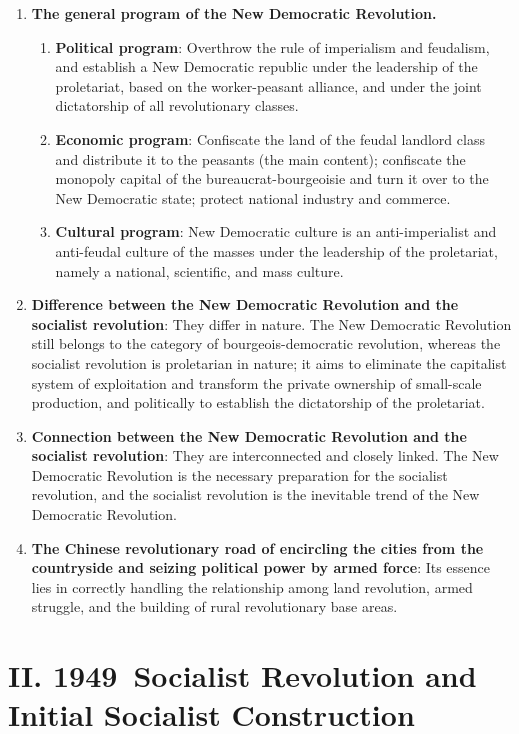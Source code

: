 \documentclass[11pt,a4paper]{ctexart}
\begin{document}
\begin{enumerate}[leftmargin=2em]
    \item \textbf{The general program of the New Democratic Revolution.}
    \begin{enumerate}[label=(\arabic*),leftmargin=2em]
        \item \textbf{Political program}: Overthrow the rule of imperialism and feudalism, and establish a New Democratic republic under the leadership of the proletariat, based on the worker-peasant alliance, and under the joint dictatorship of all revolutionary classes.
        \item \textbf{Economic program}: Confiscate the land of the feudal landlord class and distribute it to the peasants (the main content); confiscate the monopoly capital of the bureaucrat-bourgeoisie and turn it over to the New Democratic state; protect national industry and commerce.
        \item \textbf{Cultural program}: New Democratic culture is an anti-imperialist and anti-feudal culture of the masses under the leadership of the proletariat, namely a national, scientific, and mass culture.
    \end{enumerate}
    
    \item \textbf{Difference between the New Democratic Revolution and the socialist revolution}: They differ in nature. The New Democratic Revolution still belongs to the category of bourgeois-democratic revolution, whereas the socialist revolution is proletarian in nature; it aims to eliminate the capitalist system of exploitation and transform the private ownership of small-scale production, and politically to establish the dictatorship of the proletariat.
    
    \item \textbf{Connection between the New Democratic Revolution and the socialist revolution}: They are interconnected and closely linked. The New Democratic Revolution is the necessary preparation for the socialist revolution, and the socialist revolution is the inevitable trend of the New Democratic Revolution.
    
    \item \textbf{The Chinese revolutionary road of encircling the cities from the countryside and seizing political power by armed force}: Its essence lies in correctly handling the relationship among land revolution, armed struggle, and the building of rural revolutionary base areas.
\end{enumerate}

\section{II. 1949~Socialist Revolution and Initial Socialist Construction}
\end{document}
